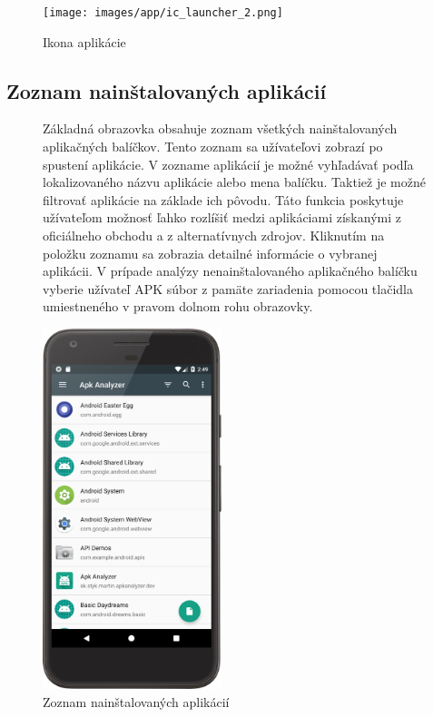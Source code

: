 \begin{figure}[htb]
	\centering
    \texttt{[image: images/app/ic\_launcher\_2.png]}
	\caption{Ikona aplikácie}
	\label{fig:icon}
\end{figure}


\subsection{Zoznam nainštalovaných aplikácií}
\begin{figure}[H]
\begin{minipage}[t]{0.48\textwidth}
Základná obrazovka obsahuje zoznam všetkých nainštalovaných aplikačných balíčkov. Tento zoznam sa užívateľovi zobrazí po spustení aplikácie. V zozname aplikácií je možné vyhľadávať podľa lokalizovaného názvu aplikácie alebo mena balíčku. Taktiež je možné filtrovať aplikácie na základe ich pôvodu. Táto funkcia poskytuje užívateľom možnosť ľahko rozlíšiť medzi aplikáciami získanými z oficiálneho obchodu a z alternatívnych zdrojov. Kliknutím na položku zoznamu sa zobrazia detailné informácie o vybranej aplikácii. V prípade analýzy nenainštalovaného aplikačného balíčku vyberie užívateľ APK súbor z pamäte zariadenia pomocou tlačidla umiestneného v pravom dolnom rohu obrazovky.
\end{minipage}%
\hfill
\centering
\begin{minipage}[t][][b]{0.45\textwidth}
\centering
\includegraphics[width=5.2cm]{images/app/list_device.png}
\centering
\caption{Zoznam nainštalovaných aplikácií}
\label{fig:app-list}
\end{minipage}%
\end{figure}

